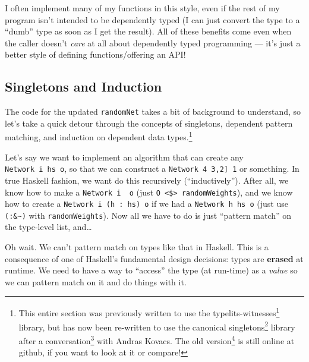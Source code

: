 \documentclass[]{article}
\renewcommand{\href}[2]{#2\footnote{\url{#1}}}
\begin{document}
I often implement many of my functions in this style, even if the rest of my
program isn't intended to be dependently typed (I can just convert the type to a
``dumb'' type as soon as I get the result). All of these benefits come even when
the caller doesn't \emph{care} at all about dependently typed programming ---
it's just a better style of defining functions/offering an API!

\hypertarget{singletons-and-induction}{%
\subsection{Singletons and Induction}\label{singletons-and-induction}}

The code for the updated \texttt{randomNet} takes a bit of background to
understand, so let's take a quick detour through the concepts of singletons,
dependent pattern matching, and induction on dependent data types.\footnote{This
  entire section was previously written to use the
  \href{http://hackage.haskell.org/package/typelits-witnesses}{typelits-witnesses}
  library, but has now been re-written to use the canonical
  \href{https://hackage.haskell.org/package/singletons}{singletons} library
  after a
  \href{https://www.reddit.com/r/haskell/comments/4l199z/practical_dependent_types_in_haskell_type_safe/d3jkslv}{conversation}
  with Andras Kovacs. The
  \href{https://github.com/mstksg/inCode/blob/697c1f726b9ab9c3f9830ed5521bfeee6ec10727/entry/practical-dependent-types-in-haskell-1.md\#singletons-and-induction}{old
  version} is still online at github, if you want to look at it or compare!}

Let's say we want to implement an algorithm that can create any
\texttt{Network\ i\ hs\ o}, so that we can construct a
\texttt{Network\ 4\ \textquotesingle{}{[}3,2{]}\ 1} or something. In true
Haskell fashion, we want do this recursively (``inductively''). After all, we
know how to make a \texttt{Network\ i\ \textquotesingle{}{[}{]}\ o} (just
\texttt{O\ \textless{}\$\textgreater{}\ randomWeights}), and we know how to
create a \texttt{Network\ i\ (h\ \textquotesingle{}:\ hs)\ o} if we had a
\texttt{Network\ h\ hs\ o} (just use \texttt{(:\&\textasciitilde{})} with
\texttt{randomWeights}). Now all we have to do is just ``pattern match'' on the
type-level list, and\ldots{}

Oh wait. We can't pattern match on types like that in Haskell. This is a
consequence of one of Haskell's fundamental design decisions: types are
\textbf{erased} at runtime. We need to have a way to ``access'' the type (at
run-time) as a \emph{value} so we can pattern match on it and do things with it.
\end{document}
